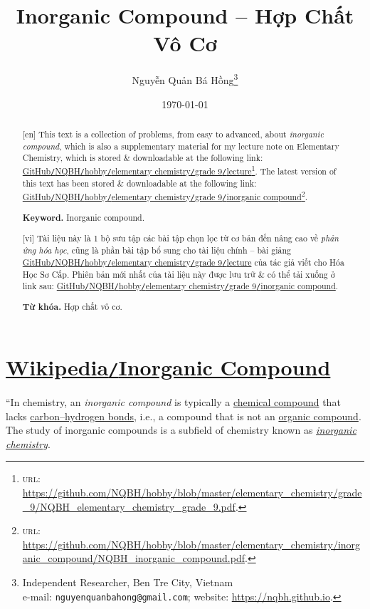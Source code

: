 \documentclass{article}
\title{Inorganic Compound -- Hợp Chất Vô Cơ}
\author{Nguyễn Quản Bá Hồng\footnote{Independent Researcher, Ben Tre City, Vietnam\\e-mail: \texttt{nguyenquanbahong@gmail.com}; website: \url{https://nqbh.github.io}.}}
\date{\today}
\begin{document}
\maketitle
\begin{abstract}
	\textsf{[en]} This text is a collection of problems, from easy to advanced, about \textit{inorganic compound}, which is also a supplementary material for my lecture note on Elementary Chemistry, which is stored \& downloadable at the following link: \href{https://github.com/NQBH/hobby/blob/master/elementary_chemistry/grade_9/NQBH_elementary_chemistry_grade_9.pdf}{GitHub\texttt{/}NQBH\texttt{/}hobby\texttt{/}elementary chemistry\texttt{/}grade 9\texttt{/}lecture}\footnote{\textsc{url}: \url{https://github.com/NQBH/hobby/blob/master/elementary_chemistry/grade_9/NQBH_elementary_chemistry_grade_9.pdf}.}. The latest version of this text has been stored \& downloadable at the following link: \href{https://github.com/NQBH/hobby/blob/master/elementary_chemistry/inorganic_compound/NQBH_inorganic_compound.pdf}{GitHub\texttt{/}NQBH\texttt{/}hobby\texttt{/}elementary chemistry\texttt{/}grade 9\texttt{/}inorganic compound}\footnote{\textsc{url}: \url{https://github.com/NQBH/hobby/blob/master/elementary_chemistry/inorganic_compound/NQBH_inorganic_compound.pdf}.}.
	
	\textsf{\textbf{Keyword.} Inorganic compound.}
	\vspace{2mm}
	
	\textsf{[vi]} Tài liệu này là 1 bộ sưu tập các bài tập chọn lọc từ cơ bản đến nâng cao về \textit{phản ứng hóa học}, cũng là phần bài tập bổ sung cho tài liệu chính -- bài giảng \href{https://github.com/NQBH/hobby/blob/master/elementary_chemistry/grade_9/NQBH_elementary_chemistry_grade_9.pdf}{GitHub\texttt{/}NQBH\texttt{/}hobby\texttt{/}elementary chemistry\texttt{/}grade 9\texttt{/}lecture} của tác giả viết cho Hóa Học Sơ Cấp. Phiên bản mới nhất của tài liệu này được lưu trữ \& có thể tải xuống ở link sau: \href{https://github.com/NQBH/hobby/blob/master/elementary_chemistry/grade_9/real/NQBH_real.pdf}{GitHub\texttt{/}NQBH\texttt{/}hobby\texttt{/}elementary chemistry\texttt{/}grade 9\texttt{/}inorganic compound}.
	
	\textsf{\textbf{Từ khóa.} Hợp chất vô cơ.}
\end{abstract}
\setcounter{secnumdepth}{4}
\setcounter{tocdepth}{3}
\tableofcontents


\section{\href{https://en.wikipedia.org/wiki/Inorganic_compound}{Wikipedia\texttt{/}Inorganic Compound}}
``In chemistry, an \textit{inorganic compound} is typically a \href{https://en.wikipedia.org/wiki/Chemical_compound}{chemical compound} that lacks \href{https://en.wikipedia.org/wiki/Carbon%E2%90%93hydrogen_bond}{carbon--hydrogen bonds}, i.e., a compound that is not an \href{https://en.wikipedia.org/wiki/Organic_compound}{organic compound}. The study of inorganic compounds is a subfield of chemistry known as \href{https://en.wikipedia.org/wiki/Inorganic_chemistry}{\textit{inorganic chemistry}}.
\end{document}
